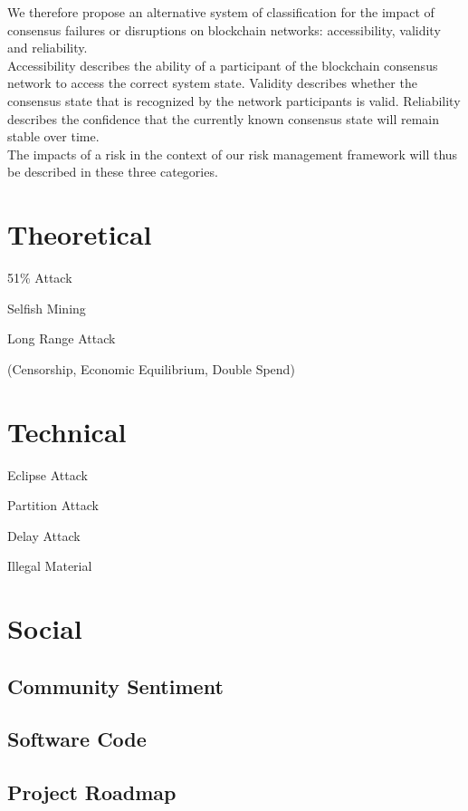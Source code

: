 \documentclass[11pt,a4paper,draft]{article}
\begin{document}
We therefore propose an alternative system of classification for the impact of consensus failures or disruptions on blockchain networks: accessibility, validity and reliability.\\

Accessibility describes the ability of a participant of the blockchain consensus network to access the correct system state. Validity describes whether the consensus state that is recognized by the network participants is valid. Reliability describes the confidence that the currently known consensus state will remain stable over time.\\

The impacts of a risk in the context of our risk management framework will thus be described in these three categories.\\

\section{Theoretical}

51\% Attack

Selfish Mining

Long Range Attack

(Censorship, Economic Equilibrium, Double Spend)


\section{Technical}

Eclipse Attack

Partition Attack

Delay Attack

Illegal Material

\section{Social}

\subsection{Community Sentiment}

\subsection{Software Code}

\subsection{Project Roadmap}
\end{document}
